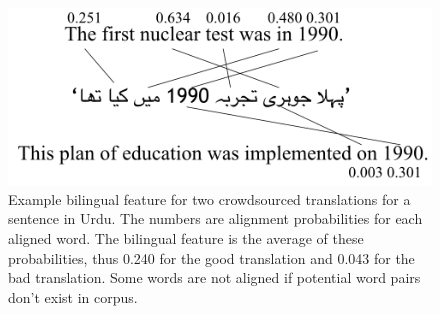 \begin{figure}
  \centering
  \includegraphics[width=\linewidth]{bilingualexample/example.png}
  \caption{Example bilingual feature for two crowdsourced translations for a sentence in Urdu. The numbers are alignment probabilities for each aligned word. The bilingual feature is the average of these probabilities, thus 0.240 for the good translation and 0.043 for the bad translation. Some words are not aligned if potential word pairs don't exist in corpus.
}
    \label{biexample1}
\end{figure}

